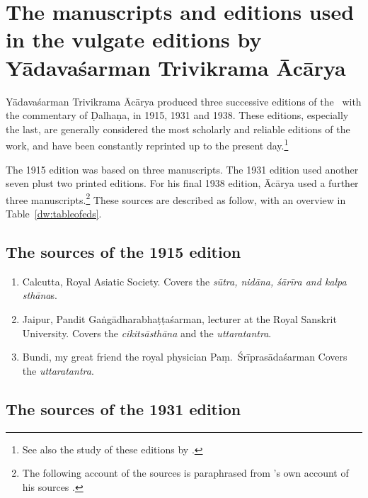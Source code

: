 \section{The manuscripts and editions used in the vulgate editions by 
    Yādavaśarman Trivikrama Ācārya}

Yādavaśarman Trivikrama Ācārya produced three successive editions of the
\SS\ with the commentary of Ḍalhaṇa, in 1915, 1931 and 1938.  These
editions, especially the last, are generally considered the most scholarly
and reliable editions of the work, and have been constantly reprinted up
to the present day.\footnote{See also the study of these editions by \textcites[\S 
1.2]{kleb-2021b}[143--144]{wuja-2013}.}

The 1915 edition was based on three manuscripts.  The 1931 edition used another
seven plust two printed editions.  For his final 1938 edition, Ācārya used a
further three manuscripts.\footnote{The following account of the sources is
paraphrased from \citeauthor{susr-trikamji3}'s own account of his sources
\citep[22]{susr-trikamji3}.}  These sources are described as follow, with an
overview in Table~\ref{dw:tableofeds}.

\subsection{The sources of the 1915 edition}

\begin{enumerate}
    \item[1] Calcutta, Royal Asiatic Society.  Covers the \emph{sūtra, nidāna, śārīra and 
        kalpa sthāna}s.  
    
    \item [2] Jaipur, Pandit Gaṅgādharabhaṭṭaśarman, lecturer at the Royal 
    Sanskrit University.  Covers the \emph{cikitsāsthāna} and the \emph{uttaratantra}.
    
    \item [3]  Bundi, my great friend the royal physician Paṃ.\ Śrīprasādaśarman  
    Covers the \emph{uttaratantra}.
\end{enumerate}

\subsection{The sources of the 1931 edition}

